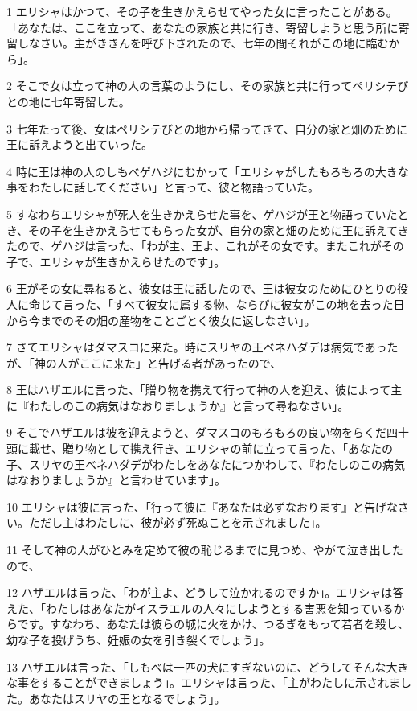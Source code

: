 \par 1 エリシャはかつて、その子を生きかえらせてやった女に言ったことがある。「あなたは、ここを立って、あなたの家族と共に行き、寄留しようと思う所に寄留しなさい。主がききんを呼び下されたので、七年の間それがこの地に臨むから」。
\par 2 そこで女は立って神の人の言葉のようにし、その家族と共に行ってペリシテびとの地に七年寄留した。
\par 3 七年たって後、女はペリシテびとの地から帰ってきて、自分の家と畑のために王に訴えようと出ていった。
\par 4 時に王は神の人のしもべゲハジにむかって「エリシャがしたもろもろの大きな事をわたしに話してください」と言って、彼と物語っていた。
\par 5 すなわちエリシャが死人を生きかえらせた事を、ゲハジが王と物語っていたとき、その子を生きかえらせてもらった女が、自分の家と畑のために王に訴えてきたので、ゲハジは言った、「わが主、王よ、これがその女です。またこれがその子で、エリシャが生きかえらせたのです」。
\par 6 王がその女に尋ねると、彼女は王に話したので、王は彼女のためにひとりの役人に命じて言った、「すべて彼女に属する物、ならびに彼女がこの地を去った日から今までのその畑の産物をことごとく彼女に返しなさい」。
\par 7 さてエリシャはダマスコに来た。時にスリヤの王ベネハダデは病気であったが、「神の人がここに来た」と告げる者があったので、
\par 8 王はハザエルに言った、「贈り物を携えて行って神の人を迎え、彼によって主に『わたしのこの病気はなおりましょうか』と言って尋ねなさい」。
\par 9 そこでハザエルは彼を迎えようと、ダマスコのもろもろの良い物をらくだ四十頭に載せ、贈り物として携え行き、エリシャの前に立って言った、「あなたの子、スリヤの王ベネハダデがわたしをあなたにつかわして、『わたしのこの病気はなおりましょうか』と言わせています」。
\par 10 エリシャは彼に言った、「行って彼に『あなたは必ずなおります』と告げなさい。ただし主はわたしに、彼が必ず死ぬことを示されました」。
\par 11 そして神の人がひとみを定めて彼の恥じるまでに見つめ、やがて泣き出したので、
\par 12 ハザエルは言った、「わが主よ、どうして泣かれるのですか」。エリシャは答えた、「わたしはあなたがイスラエルの人々にしようとする害悪を知っているからです。すなわち、あなたは彼らの城に火をかけ、つるぎをもって若者を殺し、幼な子を投げうち、妊娠の女を引き裂くでしょう」。
\par 13 ハザエルは言った、「しもべは一匹の犬にすぎないのに、どうしてそんな大きな事をすることができましょう」。エリシャは言った、「主がわたしに示されました。あなたはスリヤの王となるでしょう」。
